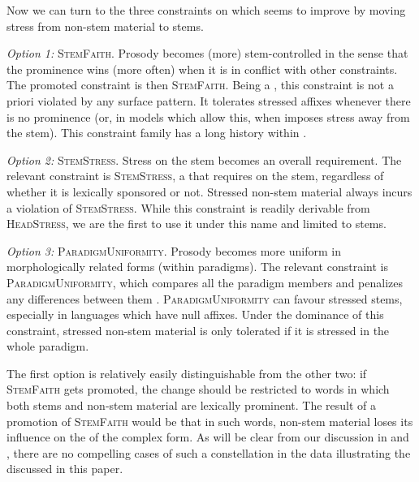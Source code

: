 \documentclass[output=paper,nonflat,colorlinks,citecolor=brown,newtxmath]{langsci/langscibook}
\begin{document}
Now we can turn to the three constraints on which  seems to improve by moving stress from non-stem material to stems.

\textit{Option 1:} \textsc{StemFaith}. Prosody becomes (more) stem-controlled in the sense that the  prominence wins (more often) when it is in conflict with other constraints. The promoted constraint is then \textsc{StemFaith}. Being a , this constraint is not a priori violated by any surface pattern. It tolerates stressed  affixes whenever there is no  prominence (or, in models which allow this, when   imposes stress away from the stem). This constraint family has a long history within  \citep[see also][]{Alderete2001}.

\textit{Option 2:} \textsc{StemStress}. Stress on the stem becomes an overall requirement. The relevant constraint is \textsc{StemStress}, a  that requires  on the stem, regardless of whether it is lexically sponsored or not. Stressed non-stem material always incurs a violation of \textsc{StemStress}. While this constraint is readily derivable from  \textsc{HeadStress}, we are the first to use it under this name and limited to stems.

\textit{Option 3:} \textsc{ParadigmUniformity}. Prosody becomes more uniform in morphologically related forms (within paradigms). The relevant constraint is  \textsc{Para\-digm\-Uni\-formity}, which compares all the paradigm members and penalizes any differences between them \citep{Burzio1996constraints, Kenstowicz1996}. \textsc{Para\-digm\-Uni\-form\-ity} can favour stressed stems, especially in languages which have null  affixes. Under the dominance of this constraint, stressed non-stem material is only tolerated if it is stressed in the whole paradigm.

The first option is relatively easily distinguishable from the other two: if \textsc{StemFaith} gets promoted, the change should be restricted to words in which both stems and non-stem material are lexically prominent. The result of a promotion of \textsc{StemFaith} would be that in such words, non-stem material loses its influence on the  of the complex form. As will be clear from our discussion in  and  , there are no compelling cases of such a constellation in the data illustrating the  discussed in this paper.
\end{document}
